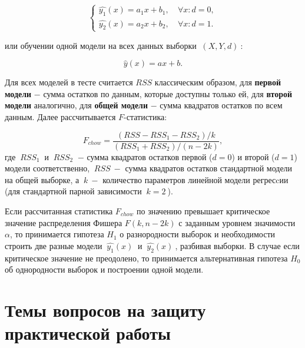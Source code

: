 \documentclass[
]{article}
\begin{document}
\[
\left\{\begin{matrix}
\hat{y_1}(x) = a_1x + b_1,\ & \forall x: d = 0,\\
\hat{y_2}(x) = a_2x + b_2,\ & \forall x: d = 1.
\end{matrix}\right.
\]

или обучении одной модели на всех данных выборки \(\ (X, Y, d)\ \):

\[
\hat{y}(x) = ax + b.
\]

Для всех моделей в тесте считается \(RSS\) классическим образом, для
\textbf{первой модели} \(-\) сумма остатков по данным, которые доступны
только ей, для \textbf{второй модели} аналогично, для \textbf{общей
модели} \(-\) сумма квадратов остатков по всем данным. Далее
рассчитывается \(F\)-статистика:

\[
F_{chow} = \frac{(RSS - RSS_1 - RSS_2) / k}{(RSS_1 + RSS_2) / (n - 2k)},
\] где \(\ RSS_1\ \) и \(\ RSS_2\ \) \(-\) сумма квадратов остатков
первой (\(d = 0\)) и второй (\(d = 1\)) модели соответственно,
\(\ RSS\ -\) сумма квадратов остатков стандартной модели на общей
выборке, а \(\ k\ -\) количество параметров линейной модели регресcии
(для стандартной парной зависимости \(\ k = 2\ \)).

Если рассчитанная статистика \(F_{chow}\) по значению превышает
критическое значение распределения Фишера \(F(k, n-2k)\) с заданным
уровнем значимости \(\alpha\), то принимается гипотеза \(H_1\) о
разнородности выборок и необходимости строить две разные модели
\(\ \hat{y_1}(x)\ \) и \(\ \hat{y_2}(x)\ \), разбивая выборки. В случае
если критическое значение не преодолено, то принимается альтернативная
гипотеза \(H_0\) об однородности выборок и построении одной модели.

\hypertarget{ux442ux435ux43cux44b-ux432ux43eux43fux440ux43eux441ux43eux432-ux43dux430-ux437ux430ux449ux438ux442ux443-ux43fux440ux430ux43aux442ux438ux447ux435ux441ux43aux43eux439-ux440ux430ux431ux43eux442ux44b}{%
\section{\texorpdfstring{\textbf{Темы вопросов на защиту практической
работы}}{Темы вопросов на защиту практической работы}}\label{ux442ux435ux43cux44b-ux432ux43eux43fux440ux43eux441ux43eux432-ux43dux430-ux437ux430ux449ux438ux442ux443-ux43fux440ux430ux43aux442ux438ux447ux435ux441ux43aux43eux439-ux440ux430ux431ux43eux442ux44b}}
\end{document}
